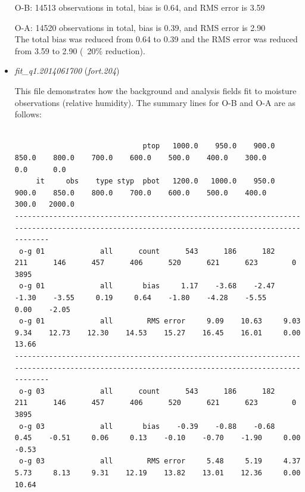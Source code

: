 \begin{itemize}[leftmargin=*]
\begin{tiny}
\begin{verbatim}
\end{verbatim}
\end{tiny}

	\hspace{1cm} O-B: 14513 observations in total, bias is 0.64, and RMS error is 3.59

	\hspace{1cm} O-A: 14520 observations in total, bias is 0.39, and RMS error is 2.90\\
The total bias was reduced from 0.64 to 0.39 and the RMS error was reduced from 3.59 to 2.90 (~20\% reduction).\\


\item \textit{fit\_q1.2014061700} (\textit{fort.204})

This file demonstrates how the background and analysis fields fit to moisture observations (relative humidity). The summary lines for O-B and O-A are as follows:

\begin{tiny}
\begin{verbatim}

                              ptop   1000.0    950.0    900.0    850.0    800.0    700.0    600.0    500.0    400.0    300.0      0.0      0.0
     it     obs    type styp  pbot   1200.0   1000.0    950.0    900.0    850.0    800.0    700.0    600.0    500.0    400.0    300.0   2000.0
----------------------------------------------------------------------------------------------------------------------------------------------
 o-g 01             all      count      543      186      182      211      146      457      406      520      621      623        0     3895
 o-g 01             all       bias     1.17    -3.68    -2.47    -1.30    -3.55     0.19     0.64    -1.80    -4.28    -5.55     0.00    -2.05
 o-g 01             all        RMS error     9.09    10.63     9.03     9.34    12.73    12.30    14.53    15.27    16.45    16.01     0.00    13.66
----------------------------------------------------------------------------------------------------------------------------------------------
 o-g 03             all      count      543      186      182      211      146      457      406      520      621      623        0     3895
 o-g 03             all       bias    -0.39    -0.88    -0.68     0.45    -0.51     0.06     0.13    -0.10    -0.70    -1.90     0.00    -0.53
 o-g 03             all        RMS error     5.48     5.19     4.37     5.73     8.13     9.31    12.19    13.82    13.01    12.36     0.00    10.64


\end{verbatim}
\end{tiny}
\end{itemize}
